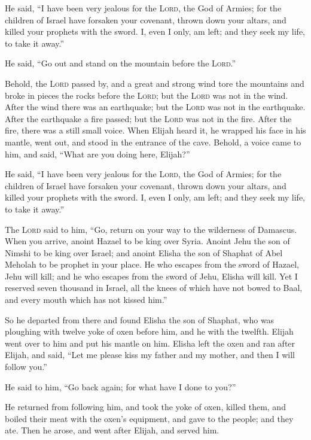  He said, ``I have been very jealous for the
\textsc{Lord}, the God of Armies; for the children of Israel have
forsaken your covenant, thrown down your altars, and killed your
prophets with the sword. I, even I only, am left; and they seek my life,
to take it away.''

 He said, ``Go out and stand on the mountain before the
\textsc{Lord}.''

Behold, the \textsc{Lord} passed by, and a great and strong wind tore
the mountains and broke in pieces the rocks before the \textsc{Lord};
but the \textsc{Lord} was not in the wind. After the wind there was an
earthquake; but the \textsc{Lord} was not in the earthquake.
 After the earthquake a fire passed; but the
\textsc{Lord} was not in the fire. After the fire, there was a still
small voice.  When Elijah heard it, he wrapped his face
in his mantle, went out, and stood in the entrance of the cave. Behold,
a voice came to him, and said, ``What are you doing here, Elijah?''

 He said, ``I have been very jealous for the
\textsc{Lord}, the God of Armies; for the children of Israel have
forsaken your covenant, thrown down your altars, and killed your
prophets with the sword. I, even I only, am left; and they seek my life,
to take it away.''

 The \textsc{Lord} said to him, ``Go, return on your way
to the wilderness of Damascus. When you arrive, anoint Hazael to be king
over Syria.  Anoint Jehu the son of Nimshi to be king
over Israel; and anoint Elisha the son of Shaphat of Abel Meholah to be
prophet in your place.  He who escapes from the sword of
Hazael, Jehu will kill; and he who escapes from the sword of Jehu,
Elisha will kill.  Yet I reserved seven thousand in
Israel, all the knees of which have not bowed to Baal, and every mouth
which has not kissed him.''

 So he departed from there and found Elisha the son of
Shaphat, who was ploughing with twelve yoke of oxen before him, and he
with the twelfth. Elijah went over to him and put his mantle on him.
 Elisha left the oxen and ran after Elijah, and said,
``Let me please kiss my father and my mother, and then I will follow
you.''

He said to him, ``Go back again; for what have I done to you?''

 He returned from following him, and took the yoke of
oxen, killed them, and boiled their meat with the oxen's equipment, and
gave to the people; and they ate. Then he arose, and went after Elijah,
and served him.

